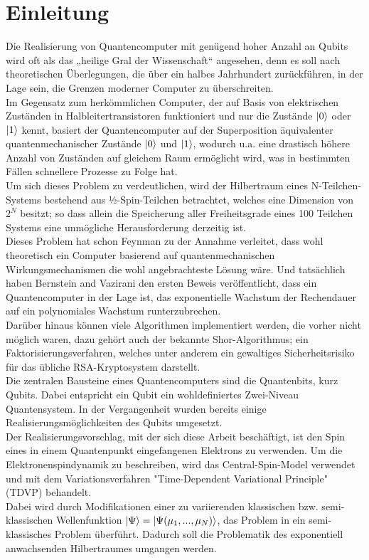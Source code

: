 \chapter{Einleitung}
Die Realisierung von Quantencomputer mit genügend hoher Anzahl an Qubits wird oft als das „heilige Gral der Wissenschaft“ angesehen, denn 
es soll nach theoretischen Überlegungen, die über ein halbes Jahrhundert zurückführen, in der Lage sein, die Grenzen moderner Computer zu 
überschreiten. \\
Im Gegensatz zum herkömmlichen Computer, der auf Basis von elektrischen Zuständen in Halbleitertransistoren funktioniert 
und nur die Zustände $\ket{0}$ oder $\ket{1}$ kennt, basiert der Quantencomputer auf der Superposition äquivalenter 
quantenmechanischer Zustände $\ket{0}$ und $\ket{1}$, wodurch u.a. eine drastisch höhere Anzahl von Zuständen auf gleichem Raum ermöglicht 
wird, was in bestimmten Fällen schnellere Prozesse zu Folge hat.\\
Um sich dieses Problem zu verdeutlichen, wird der Hilbertraum eines N-Teilchen-Systems bestehend aus ½-Spin-Teilchen betrachtet, welches eine 
Dimension von $2^N$ besitzt; so dass allein die Speicherung aller Freiheitsgrade eines 100 Teilchen Systems eine unmögliche Herausforderung
derzeitig ist. \\
Dieses Problem hat schon Feynman zu der Annahme verleitet, dass wohl theoretisch ein Computer basierend 
auf quantenmechanischen Wirkungsmechanismen die wohl angebrachteste Lösung wäre. Und tatsächlich haben Bernstein and Vazirani 
den ersten Beweis veröffentlicht, dass ein Quantencomputer in der Lage ist, das exponentielle Wachstum der Rechendauer auf ein 
polynomiales Wachstum runterzubrechen.\\
Darüber hinaus können viele Algorithmen implementiert werden, die vorher nicht möglich waren, dazu gehört auch der bekannte Shor-Algorithmus; 
ein Faktorisierungsverfahren, welches unter anderem ein gewaltiges Sicherheitsrisiko für das übliche RSA-Kryptosystem darstellt.\\

\noindent Die zentralen Bausteine eines Quantencomputers sind die Quantenbits, kurz Qubits. Dabei entspricht ein Qubit ein wohldefiniertes
Zwei-Niveau Quantensystem. In der Vergangenheit wurden bereits einige Realisierungsmöglichkeiten des Qubits umgesetzt.\\
Der Realisierungsvorschlag, mit der sich diese Arbeit beschäftigt, ist den Spin eines in einem Quantenpunkt eingefangenen 
Elektrons zu verwenden. Um die Elektronenspindynamik zu beschreiben, wird das Central-Spin-Model verwendet und mit 
dem Variationsverfahren "Time-Dependent Variational Principle" (TDVP) behandelt.\\

\noindent Dabei wird durch Modifikationen einer zu variierenden klassischen bzw. semi-klassischen Wellenfunktion 
$\ket{\Psi} = \ket{\Psi(\mu_1,...,\mu_N)}$, das Problem in ein semi-klassisches Problem überführt. Dadurch soll die Problematik des exponentiell 
anwachsenden Hilbertraumes umgangen werden.
